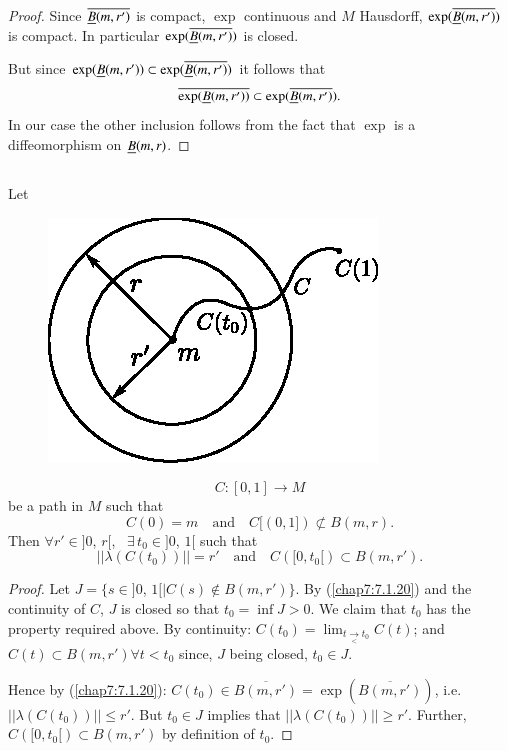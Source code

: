 \begin{proof}
Since $\overline{\underline{B}(m,r')}$ is compact, $\exp$ continuous and $M$
Hausdorff, $\exp(\overline{\underline{B}(m,r')})$ is compact. In particular
$\exp(\overline{\underline{B}(m,r')})$ is closed.

But since $\exp(\underline{B}(m,r'))\subset \exp(\overline{\underline{B}(m,r')})$ it
follows that
$$
\overline{\exp(\underline{B}(m,r'))}\subset \exp(\overline{\underline{B}(m,r')}).
$$
In our case the other inclusion follows from the fact that $\exp$ is a
diffeomorphism on $\underline{B}(m,r)$.
\end{proof}


\subsection{}\label{chap7:7.1.21}

\begin{lemma*}
Let
\begin{figure}[H]
\centering
\includegraphics[scale=1.1]{figures/chap7-fig1.eps}
\end{figure}
$$
C:[0,1]\to M
$$
be a path in $M$ such that
$$
C(0)=m\quad\text{and}\quad C[(0,1])\not\subset B(m,r).
$$
Then $\forall r'\in ]0$, $r[$, \ $\exists\, t_{0}\in ]0$, $1[$ such
    that
$$
||\lambda(C(t_{0}))||=r'\quad\text{and}\quad C([0,t_{0}[)\subset B(m,r').
$$
\end{lemma*}

\begin{proof}
Let $J=\{s\in ]0$, $1[|C(s)\not\in B(m,r')\}$. By (\ref{chap7:7.1.20})
    and the continuity of $C$, $J$ is closed so that $t_{0}=\inf
    J>0$. We claim that $t_{0}$ has the property required above. By
    continuity:  $C(t_{0})=\lim_{t\xrightarrow[<]{}t_{0}}C(t)$; and
      $C(t)\subset B(m,r')\forall t<t_{0}$ since, $J$ being closed,
      $t_{0}\in J$.

Hence by (\ref{chap7:7.1.20}): $C(t_{0})\in
\overline{B(m,r')}=\exp(\overline{B(m,r')})$,
i.e. $||\lambda(C(t_{0}))||\leq r'$. But $t_{0}\in J$ implies that
$||\lambda(C(t_{0}))||\geq r'$. Further, \pageoriginale
$C([0,t_{0}[)\subset B(m,r')$ by definition of $t_{0}$.
\end{proof}

